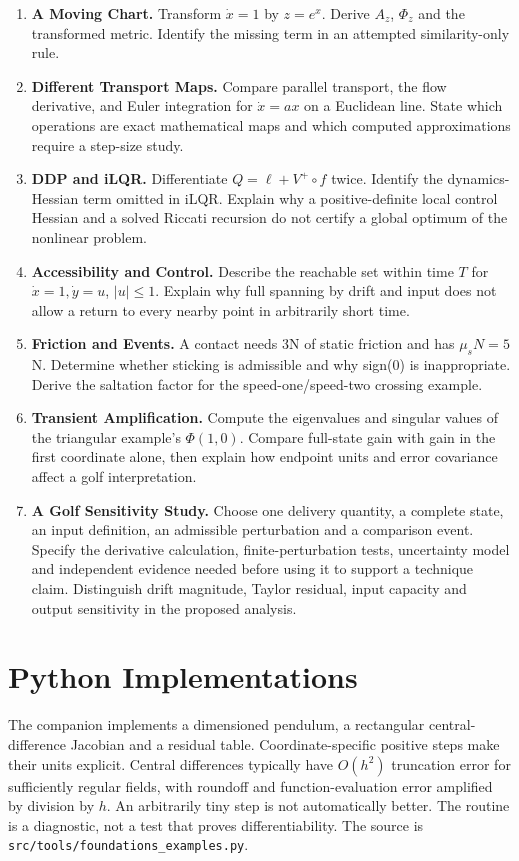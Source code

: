 \begin{enumerate}[itemsep=3pt,topsep=4pt]
mass matrix, velocity bias and generalized actuator loads from kinetic energy and virtual work.
\item \textbf{A Moving Chart.} Transform $\dot x=1$ by $z=e^x$. Derive $A_z$, $\Phi_z$
and the transformed metric. Identify the missing term in an attempted similarity-only rule.
\item \textbf{Different Transport Maps.} Compare parallel transport, the flow derivative,
and Euler integration for $\dot x=ax$ on a Euclidean line. State which operations are
exact mathematical maps and which computed approximations require a step-size study.
\item \textbf{DDP and iLQR.} Differentiate $Q=\ell+V^+\circ f$ twice. Identify the
dynamics-Hessian term omitted in iLQR. Explain why a positive-definite local control Hessian
and a solved Riccati recursion do not certify a global optimum of the nonlinear problem.
\item \textbf{Accessibility and Control.} Describe the reachable set within time $T$ for
$\dot x=1,\dot y=u$, $|u|\leq1$. Explain why full spanning by drift and input does not
allow a return to every nearby point in arbitrarily short time.
\item \textbf{Friction and Events.} A contact needs 3N of static friction and has
$\mu_sN=5$N. Determine whether sticking is admissible and why sign(0) is inappropriate.
Derive the saltation factor for the speed-one/speed-two crossing example.
\item \textbf{Transient Amplification.} Compute the eigenvalues and singular values of
the triangular example's $\Phi(1,0)$. Compare full-state gain with gain in the first
coordinate alone, then explain how endpoint units and error covariance affect a golf interpretation.
\item \textbf{A Golf Sensitivity Study.} Choose one delivery quantity, a complete state,
an input definition, an admissible perturbation and a comparison event. Specify the
derivative calculation, finite-perturbation tests, uncertainty model and independent evidence
needed before using it to support a technique claim. Distinguish drift magnitude, Taylor
residual, input capacity and output sensitivity in the proposed analysis.
\end{enumerate}

\section{Python Implementations}

The companion implements a dimensioned pendulum, a rectangular central-difference
Jacobian and a residual table. Coordinate-specific positive steps make their units
explicit. Central differences typically have $O(h^2)$ truncation error for sufficiently
regular fields, with roundoff and function-evaluation error amplified by division by $h$.
An arbitrarily tiny step is not automatically better. The routine is a diagnostic, not a
test that proves differentiability. The source is
\texttt{src/tools/foundations\_examples.py}.


